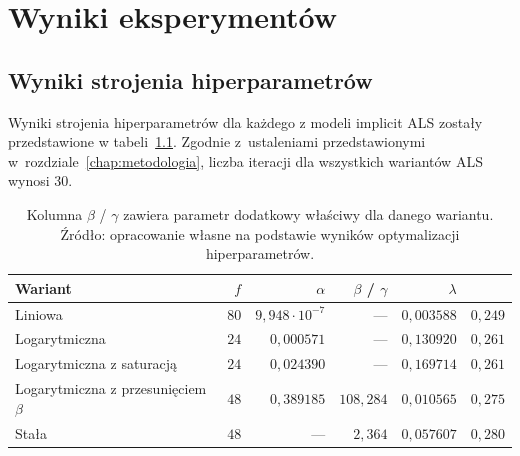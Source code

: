 \chapter{Wyniki eksperymentów}

\section{Wyniki strojenia hiperparametrów}

Wyniki strojenia hiperparametrów dla każdego z modeli implicit ALS zostały przedstawione w tabeli~\ref{tab:hiperparametry-als}. Zgodnie z~ustaleniami przedstawionymi w~rozdziale~\ref{chap:metodologia}, liczba iteracji dla wszystkich wariantów ALS wynosi 30.

\begin{table}[htbp]
\centering
\caption{Najlepsze hiperparametry wariantów ALS wybrane na zbiorze walidacyjnym}
\label{tab:hiperparametry-als}
\begin{tabular}{lrrrrr}
\toprule
Wariant & $f$ & $\alpha$ & $\beta$ / $\gamma$ & $\lambda$ & \ndcg{} \\
\midrule
Liniowa & $80$ & $9{,}948\cdot 10^{-7}$ & --- & $0{,}003588$ & $0{,}249$\\
Logarytmiczna & $24$ & $0{,}000571$ & --- & $0{,}130920$ & $0{,}261$\\
Logarytmiczna z saturacją & $24$ & $0{,}024390$ & --- & $0{,}169714$ & $0{,}261$\\
Logarytmiczna z przesunięciem $\beta$ & $48$ & $0{,}389185$ & $108{,}284$ & $0{,}010565$ & $0{,}275$\\
Stała & $48$ & --- & $2{,}364$ & $0{,}057607$ & $0{,}280$\\
\bottomrule
\end{tabular}
\caption*{\footnotesize Kolumna $\beta$ / $\gamma$ zawiera parametr dodatkowy właściwy dla danego wariantu.
Źródło: opracowanie własne na podstawie wyników optymalizacji hiperparametrów.}
\end{table}

